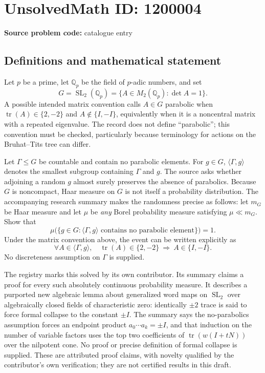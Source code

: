 \documentclass[11pt]{article}
\newcommand{\Q}{\mathbb{Q}}
\begin{document}
\section*{UnsolvedMath ID: 1200004}
\textbf{Source problem code:} catalogue entry
\subsection{Definitions and mathematical statement}
Let $p$ be a prime, let $\Q_p$ be the field of $p$-adic numbers, and set
\[
 G=\operatorname{SL}_2(\Q_p)=\{A\in M_2(\Q_p):\det A=1\}.
\]
A possible intended matrix convention calls $A\in G$ parabolic when $\operatorname{tr}(A)\in\{2,-2\}$ and $A\notin\{I,-I\}$, equivalently when it is a noncentral matrix with a repeated eigenvalue. The record does not define ``parabolic''; this convention must be checked, particularly because terminology for actions on the Bruhat--Tits tree can differ.

Let $\Gamma\leq G$ be countable and contain no parabolic elements. For $g\in G$, $\langle\Gamma,g\rangle$ denotes the smallest subgroup containing $\Gamma$ and $g$. The source asks whether adjoining a random $g$ almost surely preserves the absence of parabolics. Because $G$ is noncompact, Haar measure on $G$ is not itself a probability distribution. The accompanying research summary makes the randomness precise as follows: let $m_G$ be Haar measure and let $\mu$ be \emph{any} Borel probability measure satisfying $\mu\ll m_G$. Show that
\[
 \mu\bigl(\{g\in G:\langle\Gamma,g\rangle
                  \text{ contains no parabolic element}\}\bigr)=1.
\]
Under the matrix convention above, the event can be written explicitly as
\[
 \forall A\in\langle\Gamma,g\rangle,
 \quad\operatorname{tr}(A)\in\{2,-2\}\ \Longrightarrow\ A\in\{I,-I\}.
\]
No discreteness assumption on $\Gamma$ is supplied.

The registry marks this solved by its own contributor. Its summary claims a proof for every such absolutely continuous probability measure. It describes a purported new algebraic lemma about generalized word maps on $\operatorname{SL}_2$ over algebraically closed fields of characteristic zero: identically $\pm2$ trace is said to force formal collapse to the constant $\pm I$. The summary says the no-parabolics assumption forces an endpoint product $a_0\cdots a_k=\pm I$, and that induction on the number of variable factors uses the top two coefficients of $\operatorname{tr}(w(I+tN))$ over the nilpotent cone. No proof or precise definition of formal collapse is supplied. These are attributed proof claims, with novelty qualified by the contributor's own verification; they are not certified results in this draft.
\end{document}
